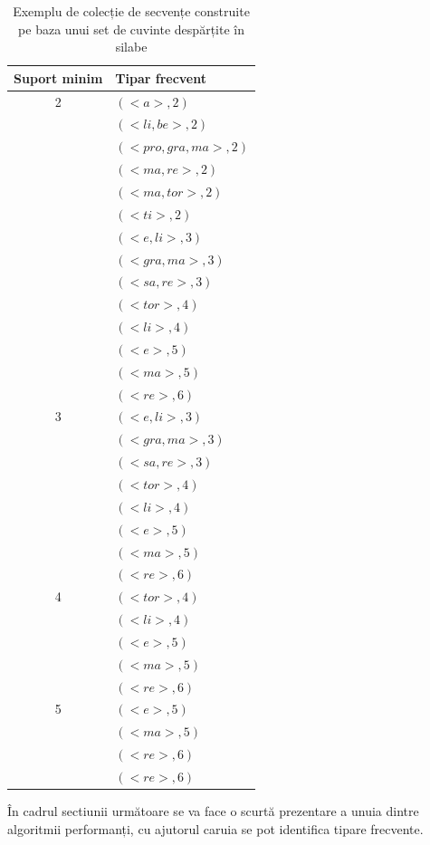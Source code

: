 \begin{table}[h!]
\centering    
\begin{tabular}{|c|l|}    
\hline      
Suport minim & Tipar frecvent\\
\hline
2& $(<a>, 2)$  \\
 & $(<li, be>, 2)$  \\
 & $(<pro, gra, ma>, 2)$  \\
 & $(<ma, re>, 2)$  \\
 & $(<ma, tor>, 2)$  \\
 & $(<ti>, 2)$  \\
 & $(<e, li>, 3)$  \\
 & $(<gra, ma>, 3)$  \\
 & $(<sa, re>, 3)$  \\
 & $(<tor>,4)$  \\
 & $(<li>, 4)$  \\
 & $(<e>, 5)$  \\
 & $(<ma>,5)$  \\
 & $(<re>, 6)$  \\
\hline
3& $(<e, li>, 3)$  \\
 & $(<gra, ma>, 3)$  \\
 & $(<sa, re>, 3)$  \\
 & $(<tor>,4)$  \\
 & $(<li>, 4)$  \\
 & $(<e>, 5)$  \\
 & $(<ma>,5)$  \\
 & $(<re>, 6)$  \\
\hline
4& $(<tor>,4)$  \\
 & $(<li>, 4)$  \\
 & $(<e>, 5)$  \\
 & $(<ma>,5)$  \\
 & $(<re>, 6)$  \\
\hline
5& $(<e>, 5)$  \\
 & $(<ma>,5)$  \\
 & $(<re>, 6)$  \\
\hline
 & $(<re>, 6)$  \\
\hline                              
\end{tabular}
\caption{Exemplu de colecție de secvențe construite pe baza unui set de cuvinte despărțite în silabe}
\label{table:sdb_patterns}               
\end{table}

În cadrul sectiunii următoare se va face o scurtă prezentare a unuia dintre algoritmii performanți, cu ajutorul caruia se pot identifica tipare frecvente. 

